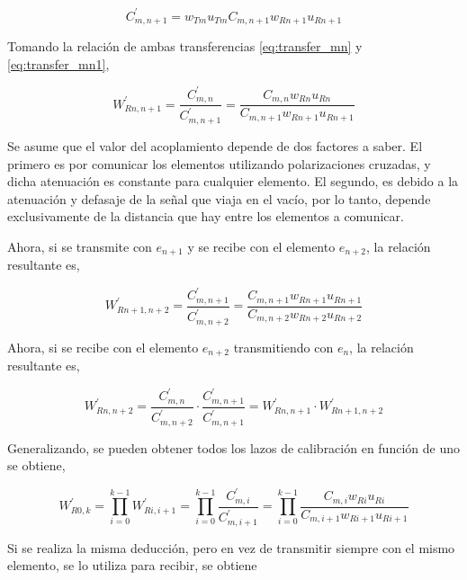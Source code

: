 \begin{equation}
	C^{'}_{m,n + 1} = w_{Tm} u_{Tm} C_{m,n + 1} w_{Rn + 1} u_{Rn + 1}
	\label{eq:transfer_mn1}
\end{equation}

Tomando la relación de ambas transferencias \ref{eq:transfer_mn} y \ref{eq:transfer_mn1},

\begin{equation}
	W^{'}_{Rn,n + 1} = \dfrac{C^{'}_{m,n}}{C^{'}_{m,n + 1}} = \dfrac{C_{m,n} w_{Rn} u_{Rn}}{C_{m,n + 1} w_{Rn + 1} u_{Rn + 1}}
\end{equation}

Se asume que el valor del acoplamiento depende de dos factores a saber. El primero es por comunicar los elementos utilizando
polarizaciones cruzadas, y dicha atenuación es constante para cualquier elemento. El segundo, es debido a la atenuación y 
defasaje de la señal que viaja en el vacío, por lo tanto, depende exclusivamente de la distancia que hay entre los elementos
a comunicar.

Ahora, si se transmite con $e_{n+1}$ y se recibe con el elemento $e_{n+2}$, la relación resultante es,

\begin{equation}
	W^{'}_{Rn + 1,n + 2} = \dfrac{C^{'}_{m,n+1}}{C^{'}_{m,n+2}} = \dfrac{C_{m,n+1} w_{Rn+1} u_{Rn+1}}{C_{m,n + 2} w_{Rn + 2} u_{Rn + 2}}
\end{equation}

Ahora, si se recibe con el elemento $e_{n+2}$ transmitiendo con $e_n$, la relación resultante es,

\begin{equation}
	W^{'}_{Rn,n + 2} = \dfrac{C^{'}_{m,n}}{C^{'}_{m,n + 2}}\cdot\dfrac{C^{'}_{m,n+1}}{C^{'}_{m,n+1}} = W^{'}_{Rn,n+1}\cdot W^{'}_{Rn+1,n + 2}
\end{equation}

Generalizando, se pueden obtener todos los lazos de calibración en función de uno se obtiene,

\begin{equation}
	W^{'}_{R0,k} = \prod_{i=0}^{k-1} W^{'}_{Ri,i+1} = \prod_{i=0}^{k-1}\dfrac{C^{'}_{m,i}}{C^{'}_{m,i+1}} =
		\prod_{i=0}^{k-1}\dfrac{C_{m,i} w_{Ri} u_{Ri}}{C_{m,i + 1} w_{Ri + 1} u_{Ri + 1}}
	\label{eq:rx_cal}
\end{equation}

Si se realiza la misma deducción, pero en vez de transmitir siempre con el mismo elemento, se lo utiliza para recibir, se obtiene 

